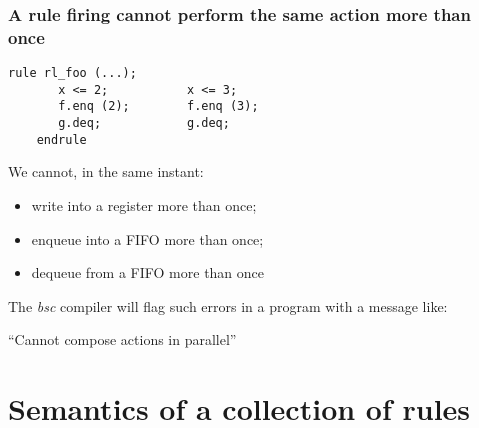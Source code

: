 \begin{frame}[fragile]
\frametitle{A rule firing cannot perform the same action more than once}

\footnotesize

\begin{minipage}{0.5\textwidth}
\begin{Verbatim}[frame=single]
    rule rl_foo (...);
       x <= 2;           x <= 3;
       f.enq (2);        f.enq (3);
       g.deq;            g.deq;
    endrule
\end{Verbatim}
\end{minipage}
\hm
\begin{minipage}{0.45\textwidth}
We cannot, in the same instant:
\begin{itemize}
 \item write into a register more than once;
 \item enqueue into a FIFO more than once;
 \item dequeue from a FIFO more than once
\end{itemize}
\end{minipage}

\vspace{5ex}

The \emph{bsc} compiler will flag such errors in a program with a
message like:

\vspace{1ex}

\hmmm ``Cannot compose actions in parallel''

\end{frame}


\section{Semantics of a collection of rules}


